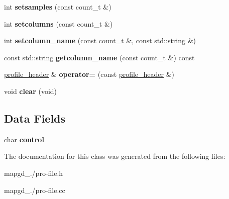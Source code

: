 \begin{DoxyCompactItemize}
\item 
\hypertarget{classprofile__header_aa0316b529c96f14c240807cb1b9027c3}{int {\bfseries setsamples} (const count\-\_\-t \&)}\label{classprofile__header_aa0316b529c96f14c240807cb1b9027c3}

\item 
\hypertarget{classprofile__header_a9e83afd1b3c7be15b90b49b7849b6768}{int {\bfseries setcolumns} (const count\-\_\-t \&)}\label{classprofile__header_a9e83afd1b3c7be15b90b49b7849b6768}

\item 
\hypertarget{classprofile__header_a7cadad0c1745947fb34071ca2ef1bdcd}{int {\bfseries setcolumn\-\_\-name} (const count\-\_\-t \&, const std\-::string \&)}\label{classprofile__header_a7cadad0c1745947fb34071ca2ef1bdcd}

\item 
\hypertarget{classprofile__header_a3ea72f2fd9bdcde0a4a5d1f1e7335e64}{const std\-::string {\bfseries getcolumn\-\_\-name} (const count\-\_\-t \&) const }\label{classprofile__header_a3ea72f2fd9bdcde0a4a5d1f1e7335e64}

\item 
\hypertarget{classprofile__header_a05787a0e90bb4f27d6b7b1cccecd20d3}{\hyperlink{classprofile__header}{profile\-\_\-header} \& {\bfseries operator=} (const \hyperlink{classprofile__header}{profile\-\_\-header} \&)}\label{classprofile__header_a05787a0e90bb4f27d6b7b1cccecd20d3}

\item 
\hypertarget{classprofile__header_a0d5f93dc2568aa4abc87f823627d4a8f}{void {\bfseries clear} (void)}\label{classprofile__header_a0d5f93dc2568aa4abc87f823627d4a8f}

\end{DoxyCompactItemize}
\subsection*{Data Fields}
\begin{DoxyCompactItemize}
\item 
\hypertarget{classprofile__header_a9bc6c1d4a979d36d060896cd2ee4d593}{char {\bfseries control}}\label{classprofile__header_a9bc6c1d4a979d36d060896cd2ee4d593}

\end{DoxyCompactItemize}


The documentation for this class was generated from the following files\-:\begin{DoxyCompactItemize}
\item 
mapgd\-\_./pro-\/file.\-h\item 
mapgd\-\_./pro-\/file.\-cc\end{DoxyCompactItemize}
